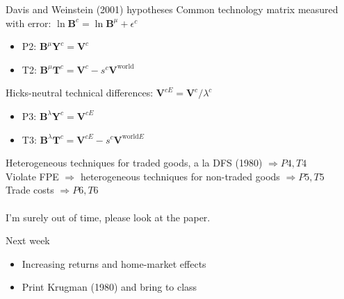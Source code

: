 \documentclass[10pt,notes=hide]{beamer}
\begin{document}
\begin{frame}{Davis and Weinstein (2001) hypotheses}
Common technology matrix measured with error: 
$\ln \mathbf{B}^c = \ln \mathbf{B}^{\mu} + \epsilon^c$
\begin{itemize}
	\item P2: $\mathbf{B}^{\mu} \mathbf{Y}^c = \mathbf{V}^c$
	\item T2: 
	$\mathbf{B}^{\mu} \mathbf{T}^c = \mathbf{V}^c - s^{c} \mathbf{V}^{\text{world}}$
\end{itemize}
Hicks-neutral technical differences:
$\mathbf{V}^{cE} = \mathbf{V}^c / \lambda^c$
\begin{itemize}
	\item P3: $\mathbf{B}^{\lambda} \mathbf{Y}^c = \mathbf{V}^{cE}$
	\item T3: 
	$\mathbf{B}^{\lambda} \mathbf{T}^c = \mathbf{V}^{cE} - s^{c} \mathbf{V}^{\text{world}E}$
\end{itemize}
Heterogeneous techniques for traded goods, a la DFS (1980) $\Rightarrow P4, T4$ \\
Violate FPE $\Rightarrow$ heterogeneous techniques for non-traded goods $\Rightarrow P5, T5$ \\
Trade costs $\Rightarrow P6, T6$ \\
\ \\
I'm surely out of time, please look at the paper.
\end{frame}
\begin{frame}{Next week}
\begin{itemize}
	\item Increasing returns and home-market effects
	\item Print Krugman (1980) and bring to class
\end{itemize}
\end{frame}
\end{document}
